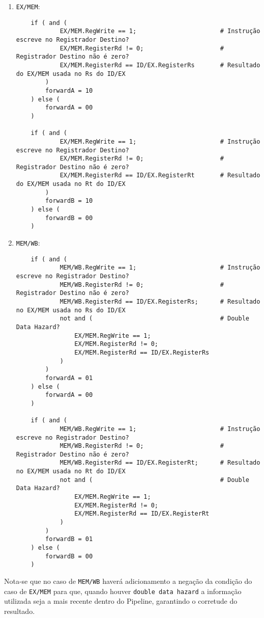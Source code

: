 \documentclass{article}
\begin{document}
\begin{enumerate}
    \item \texttt{EX/MEM}:
\begin{scriptsize}
    \myStyleRISCV
    \begin{lstlisting}
    if ( and (
            EX/MEM.RegWrite == 1;                       # Instrução escreve no Registrador Destino?
            EX/MEM.RegisterRd != 0;                     # Registrador Destino não é zero?
            EX/MEM.RegisterRd == ID/EX.RegisterRs       # Resultado do EX/MEM usada no Rs do ID/EX
        )
        forwardA = 10
    ) else (
        forwardA = 00
    )

    if ( and (
            EX/MEM.RegWrite == 1;                       # Instrução escreve no Registrador Destino?
            EX/MEM.RegisterRd != 0;                     # Registrador Destino não é zero?
            EX/MEM.RegisterRd == ID/EX.RegisterRt       # Resultado do EX/MEM usada no Rt do ID/EX
        )
        forwardB = 10
    ) else (
        forwardB = 00
    )

    \end{lstlisting}
\end{scriptsize}
    \item \texttt{MEM/WB}:
\begin{scriptsize}
    \myStyleRISCV
    \begin{lstlisting}
    if ( and (
            MEM/WB.RegWrite == 1;                       # Instrução escreve no Registrador Destino?
            MEM/WB.RegisterRd != 0;                     # Registrador Destino não é zero?
            MEM/WB.RegisterRd == ID/EX.RegisterRs;      # Resultado no EX/MEM usada no Rs do ID/EX
            not and (                                   # Double Data Hazard?
                EX/MEM.RegWrite == 1;
                EX/MEM.RegisterRd != 0;
                EX/MEM.RegisterRd == ID/EX.RegisterRs
            )
        )
        forwardA = 01
    ) else (
        forwardA = 00
    )

    if ( and (
            MEM/WB.RegWrite == 1;                       # Instrução escreve no Registrador Destino?
            MEM/WB.RegisterRd != 0;                     # Registrador Destino não é zero?
            MEM/WB.RegisterRd == ID/EX.RegisterRt;      # Resultado no EX/MEM usada no Rt do ID/EX
            not and (                                   # Double Data Hazard?
                EX/MEM.RegWrite == 1;
                EX/MEM.RegisterRd != 0;
                EX/MEM.RegisterRd == ID/EX.RegisterRt
            )
        )
        forwardB = 01
    ) else (
        forwardB = 00
    )

    \end{lstlisting}
\end{scriptsize}
\end{enumerate}
\noindent Nota-se que no caso de \texttt{MEM/WB} haverá adicionamento a negação da condição do caso de \texttt{EX/MEM} para que, quando houver \texttt{double data hazard} a informação utilizada seja a mais recente dentro do Pipeline, garantindo o corretude do resultado.\\
\end{document}
